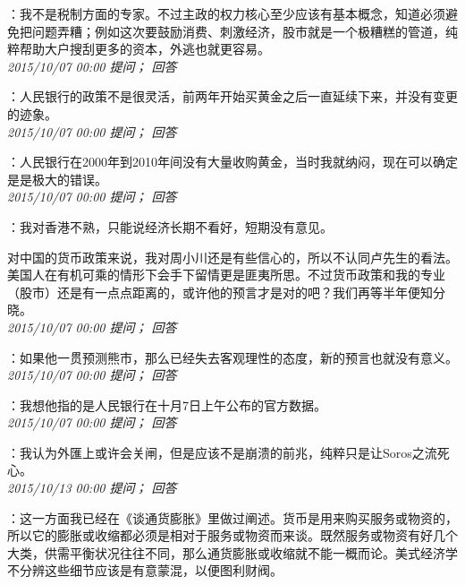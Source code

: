 \documentclass[twocolumn]{ctexart}
\begin{document}
：我不是税制方面的专家。不过主政的权力核心至少应该有基本概念，知道必须避免把问题弄糟；例如这次要鼓励消费、刺激经济，股市就是一个极糟糕的管道，纯粹帮助大户搜刮更多的资本，外逃也就更容易。\\

\textit{\hfill\noindent\small 2015/10/07 00:00 提问； 回答}

：人民银行的政策不是很灵活，前两年开始买黄金之后一直延续下来，并没有变更的迹象。\\

\textit{\hfill\noindent\small 2015/10/07 00:00 提问； 回答}

：人民银行在2000年到2010年间没有大量收购黄金，当时我就纳闷，现在可以确定是是极大的错误。\\

\textit{\hfill\noindent\small 2015/10/07 00:00 提问； 回答}

：我对香港不熟，只能说经济长期不看好，短期没有意见。

对中国的货币政策来说，我对周小川还是有些信心的，所以不认同卢先生的看法。美国人在有机可乘的情形下会手下留情更是匪夷所思。不过货币政策和我的专业（股市）还是有一点点距离的，或许他的预言才是对的吧？我们再等半年便知分晓。\\

\textit{\hfill\noindent\small 2015/10/07 00:00 提问； 回答}

：如果他一贯预测熊市，那么已经失去客观理性的态度，新的预言也就没有意义。\\

\textit{\hfill\noindent\small 2015/10/07 00:00 提问； 回答}

：我想他指的是人民银行在十月7日上午公布的官方数据。\\

\textit{\hfill\noindent\small 2015/10/07 00:00 提问； 回答}

：我认为外匯上或许会关闸，但是应该不是崩溃的前兆，纯粹只是让Soros之流死心。\\

\textit{\hfill\noindent\small 2015/10/13 00:00 提问； 回答}

：这一方面我已经在《谈通货膨胀》里做过阐述。货币是用来购买服务或物资的，所以它的膨胀或收缩都必须是相对于服务或物资而来谈。既然服务或物资有好几个大类，供需平衡状况往往不同，那么通货膨胀或收缩就不能一概而论。美式经济学不分辨这些细节应该是有意蒙混，以便图利财阀。\\
\end{document}
